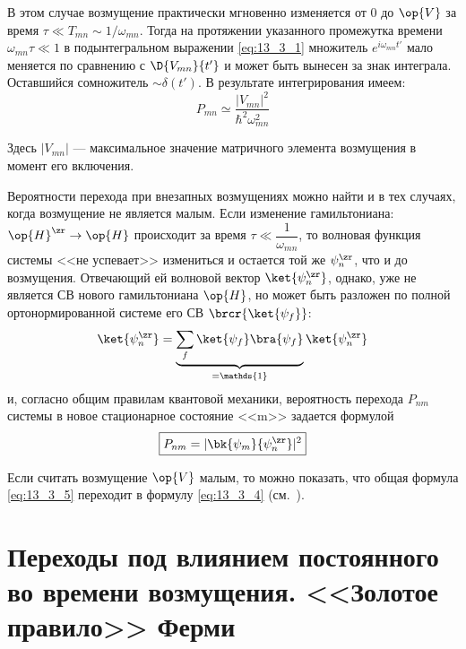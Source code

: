 В этом случае возмущение практически мгновенно изменяется от 0 до $\op{V}$ за время $\tau \ll T_{mn} \sim 1/\omega_{mn}$. Тогда на протяжении указанного промежутка времени $\omega_{mn} \tau \ll 1$ в подынтегральном выражении \eqref{eq:13_3_1} множитель $e^{i\omega_{mn} t'}$ мало меняется по сравнению с $\D{V_{mn}}{t'}$ и может быть вынесен за знак интеграла. Оставшийся сомножитель $\sim \delta(t')$. В результате интегрирования имеем:
\begin{equation}
\label{eq:13_3_4}
\boxed{P_{mn} \simeq \frac{|V_{mn}|^2}{\hbar^2 \omega_{mn}^2}}
\end{equation}

Здесь $|V_{mn}|$ --- максимальное значение матричного элемента возмущения в момент его включения.

Вероятности перехода при внезапных возмущениях можно найти и в тех случаях, когда возмущение не является малым. Если изменение гамильтониана: $\op{H}^\zr \to \op{H}$ происходит за время $\tau \ll \dfrac{1}{\omega_{mn}}$, то волновая функция системы <<не успевает>> измениться и остается той же $\psi_n^\zr$, что и до возмущения. Отвечающий ей волновой вектор $\ket{\psi_n^\zr}$, однако, уже не является СВ нового гамильтониана $\op{H}$, но может быть разложен по полной ортонормированной системе его СВ $\brcr{\ket{\psi_f}}$:
$$
\ket{\psi_n^\zr} = \underbrace{\sum_f \ket{\psi_f} \bra{\psi_f}}_{=\mathds{1}}\ket{\psi_n^\zr}
$$
и, согласно общим правилам квантовой механики, вероятность перехода $P_{nm}$ системы в новое стационарное состояние <<m>> задается формулой
\begin{equation}
\label{eq:13_3_5}
\boxed{P_{nm} = |\bk{\psi_m}{\psi_n^\zr}|^2}
\end{equation}

Если считать возмущение $\op{V}$ малым, то можно показать, что общая формула \eqref{eq:13_3_5} переходит в формулу \eqref{eq:13_3_4} (см.~).

\section{Переходы под влиянием постоянного во времени возмущения. <<Золотое правило>> Ферми}

